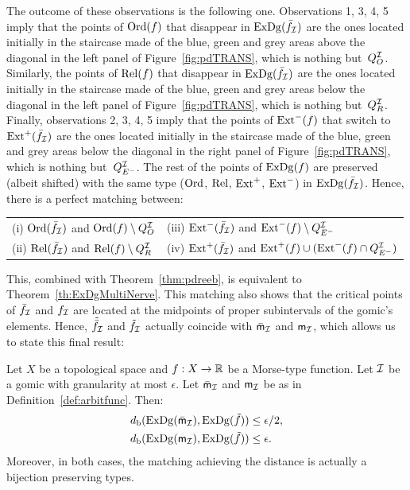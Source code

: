 %
The outcome of these observations is the following one. Observations 1, 3,
4, 5 imply that the points of $\mathrm{Ord}(f)$ that disappear in $\mathrm{ExDg}(\bar f_{\mathcal I})$
are the ones located initially in the staircase made of
the blue, green and grey areas above the diagonal in the left
panel of Figure~\ref{fig:pdTRANS}, which is nothing but~$Q_O^{\mathcal{I}}$. 
Similarly, the points of $\mathrm{Rel}(f)$
that disappear in $\mathrm{ExDg}(\bar f_{\mathcal I})$ are the ones located initially in the
staircase made of the blue, green and grey areas below the
diagonal in the left panel of Figure~\ref{fig:pdTRANS}, which is nothing but~$Q_R^{\mathcal{I}}$. 
Finally, observations 2, 3, 4, 5 imply that the points of $\mathrm{Ext}^-(f)$ that
switch to $\mathrm{Ext}^+(\bar f_{\mathcal I})$ are the ones located initially in the
staircase made of the blue, green and grey areas below the
diagonal in the right panel of Figure~\ref{fig:pdTRANS}, which is nothing but~$Q_{E^-}^{\mathcal{I}}$. 
The rest of the points of $\mathrm{ExDg}(f)$ are preserved (albeit shifted) with the same type ($\mathrm{Ord}$,
$\mathrm{Rel}$, $\mathrm{Ext}^+$, $\mathrm{Ext}^-$) in $\mathrm{ExDg}(\bar f_{\mathcal I})$. Hence, 
there is a perfect matching between:
\begin{center}
\begin{tabular}{ll}
{\rm (i)} $\mathrm{Ord}(\bar f_{\mathcal I})$ and $\mathrm{Ord}(f)\setminus Q_O^{\mathcal{I}}$ & 
{\rm (iii)} $\mathrm{Ext}^-(\bar f_{\mathcal I})$ and $\mathrm{Ext}^-(f)\setminus Q_{E^-}^{\mathcal{I}}$\\
{\rm (ii)} $\mathrm{Rel}(\bar f_{\mathcal I})$ and $\mathrm{Rel}(f)\setminus Q_R^{\mathcal{I}}$ &
{\rm (iv)} $\mathrm{Ext}^+(\bar f_{\mathcal I})$ and 
$\mathrm{Ext}^+(f) \cup (\mathrm{Ext}^-(f)\cap Q_{E^-}^{\mathcal{I}})$
\end{tabular}
\end{center}

This, combined with Theorem~\ref{thm:pdreeb}, is equivalent to Theorem~\ref{th:ExDgMultiNerve}. %
This matching also shows that the critical points of $\bar f_{\mathcal I}$ and $f_{\mathcal I}$ are  located at the midpoints
of proper subintervals of the gomic's elements. Hence, $\tilde{\bar f}_{\mathcal I}$ and $\tilde{f}_{\mathcal I}$ actually coincide with $\bar {\sf{m}}_{\mathcal I}$ and ${\sf m}_{\mathcal I}$,
which allows us to state this final result:


\begin{thm}
\label{th:MultiNerveCover}
Let $X$ be a topological space and $f:X\rightarrow\mathbb{R}$ be a Morse-type function. 
Let $\mathcal{I}$ be a gomic with granularity at most $\epsilon$.
Let $\bar {\sf{m}}_{\mathcal I}$ and ${\sf m}_{\mathcal I}$ be as in Definition~\ref{def:arbitfunc}. Then:
\begin{align}
d_{\rm b}(\mathrm{ExDg}(\bar {\sf{m}}_{\mathcal I}),\mathrm{ExDg}(\tilde f))&\leq \epsilon /2,\label{eq:BottleIneqMMapperReeb} \\
d_{\rm b}(\mathrm{ExDg}({\sf m}_{\mathcal I}),\mathrm{ExDg}(\tilde f))&\leq \epsilon.\label{eq:BottleIneqMapperReeb}
\end{align}
Moreover, in both cases, the matching achieving the distance %
is actually a bijection preserving types. 
\end{thm}

